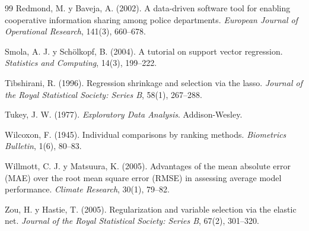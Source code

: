 \documentclass[11pt,a4paper]{article}
\begin{document}
\begin{thebibliography}{99}
Redmond, M. y Baveja, A. (2002). A data-driven software tool for enabling cooperative information sharing among police departments. \textit{European Journal of Operational Research}, 141(3), 660--678.

Smola, A. J. y Schölkopf, B. (2004). A tutorial on support vector regression. \textit{Statistics and Computing}, 14(3), 199--222.

Tibshirani, R. (1996). Regression shrinkage and selection via the lasso. \textit{Journal of the Royal Statistical Society: Series B}, 58(1), 267--288.

Tukey, J. W. (1977). \textit{Exploratory Data Analysis}. Addison-Wesley.

Wilcoxon, F. (1945). Individual comparisons by ranking methods. \textit{Biometrics Bulletin}, 1(6), 80--83.

Willmott, C. J. y Matsuura, K. (2005). Advantages of the mean absolute error (MAE) over the root mean square error (RMSE) in assessing average model performance. \textit{Climate Research}, 30(1), 79--82.

Zou, H. y Hastie, T. (2005). Regularization and variable selection via the elastic net. \textit{Journal of the Royal Statistical Society: Series B}, 67(2), 301--320.

\end{thebibliography}
\end{document}
